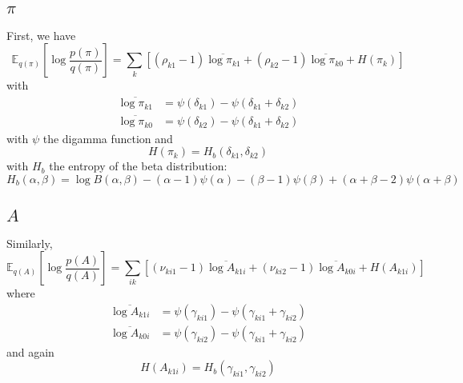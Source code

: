 \documentclass[11pt]{article}
\begin{document}
\subsection{$\pi$}
First, we have
\begin{equation}
    \mathbb{E}_{q(\pi)} \left[\log \frac{p(\pi)}{q(\pi)} \right] = \sum_k \left[(\rho_{k1} - 1)\overline{\log \pi_{k1}} + (\rho_{k2} - 1) \overline{\log \pi_{k0}} + H(\pi_k) \right]
\end{equation}
with
\begin{align}
    \overline{\log \pi_{k1}} &= \psi(\delta_{k1}) - \psi(\delta_{k1} + \delta_{k2}) \\
    \overline{\log \pi_{k0}} &= \psi(\delta_{k2}) - \psi(\delta_{k1} + \delta_{k2})
\end{align}
with $\psi$ the digamma function and 
\begin{equation}
    H(\pi_k) = H_b(\delta_{k1}, \delta_{k2})
\end{equation}
with $H_b$ the entropy of the beta distribution:
\begin{equation}
    H_b(\alpha, \beta) = \log B(\alpha, \beta) - (\alpha - 1) \psi(\alpha) - (\beta - 1) \psi(\beta) + (\alpha + \beta - 2)\psi(\alpha + \beta)
\end{equation}

\subsection{$A$} 
Similarly,
\begin{equation}
    \mathbb{E}_{q(A)} \left[\log \frac{p(A)}{q(A)} \right] = 
\sum_{ik} \left[ (\nu_{ki1} - 1) \overline{\log A_{k1i}} + (\nu_{ki2} - 1) \overline{\log A_{k0i}} + H(A_{k1i}) \right]
\end{equation}
where 
\begin{align}
    \overline{\log A_{k1i}} &= \psi(\gamma_{ki1}) - \psi(\gamma_{ki1} + \gamma_{ki2}) \\
    \overline{\log A_{k0i}} &= \psi(\gamma_{ki2}) - \psi(\gamma_{ki1} + \gamma_{ki2})
\end{align}
and again
\begin{equation}
    H(A_{k1i}) = H_b(\gamma_{ki1}, \gamma_{ki2})
\end{equation}
\end{document}
